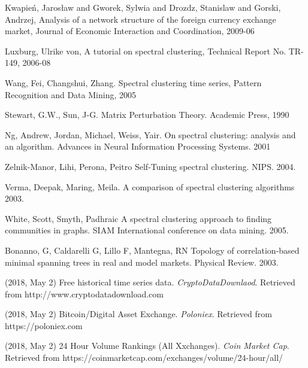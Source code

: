 \documentclass[a4paper]{article}
\begin{document}
\begin{thebibliography}{9}
	Kwapień, Jarosław and Gworek, Sylwia and Drozdz, Stanislaw and Gorski, Andrzej,
    Analysis of a network structure of the foreign currency exchange market,
    Journal of Economic Interaction and Coordination,
    2009-06
    
	Luxburg, Ulrike von,
    A tutorial on spectral clustering,
    Technical Report No. TR-149,
    2006-08
    
	Wang, Fei, Changshui, Zhang.
    Spectral clustering time series,
    Pattern Recognition and Data Mining,
    2005

	Stewart, G.W., Sun, J-G.
    Matrix Perturbation Theory.
    Academic Press,
    1990

	Ng, Andrew, Jordan, Michael, Weiss, Yair.
    On spectral clustering: analysis and an algorithm.
   	Advances in Neural Information Processing Systems.
    2001

	Zelnik-Manor, Lihi, Perona, Peitro
    Self-Tuning spectral clustering.
    NIPS.
    2004.

	Verma, Deepak, Maring, Meila.
    A comparison of spectral clustering algorithms
    2003.
    
	White, Scott, Smyth, Padhraic
    A spectral clustering approach to finding communities in graphs.
    SIAM International conference on data mining.
    2005.

	Bonanno, G, Caldarelli G, Lillo F, Mantegna, RN
    Topology of correlation-based minimal spanning trees in real and model markets.
    Physical Review.
    2003.
    
	
    (2018, May 2)
    Free historical time series data.
    \textit{CryptoDataDownlaod}.
    Retrieved from http://www.cryptodatadownload.com
    
	
    (2018, May 2)
    Bitcoin/Digital Asset Exchange.
    \textit{Poloniex}.
    Retrieved from https://poloniex.com
    
	
    (2018, May 2)
    24 Hour Volume Rankings (All Xxchanges).
    \textit{Coin Market Cap}.
    Retrieved from https://coinmarketcap.com/exchanges/volume/24-hour/all/
    
\end{thebibliography}
\newpage
\end{document}
